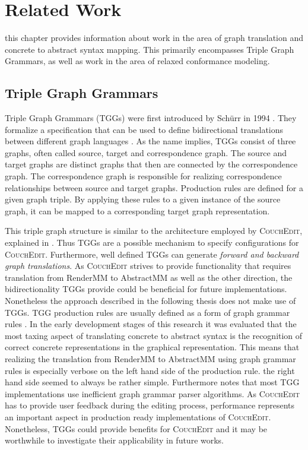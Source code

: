 \chapter{Related Work}
\label{ch:related_work}
this chapter provides information about work in the area of graph translation and concrete to abstract syntax mapping. This primarily encompasses Triple Graph Grammars, as well as work in the area of relaxed conformance modeling.




\section{Triple Graph Grammars}
\label{sec:tggs}
Triple Graph Grammars (TGGs) were first introduced by Schürr in 1994 \cite{schurr_specification_1994}. They formalize a specification that can be used to define bidirectional translations between different graph languages \cite{schurr_15_2008}. As the name implies, TGGs consist of three graphs, often called source, target and correspondence graph. The source and target graphs are distinct graphs that then are connected by the correspondence graph. The correspondence graph is responsible for realizing correspondence relationships between source and target graphs. Production rules are defined for a given graph triple. By applying these rules to a given instance of the source graph, it can be mapped to a corresponding target graph representation.

This triple graph structure is similar to the architecture employed by \textsc{CouchEdit}, explained in . Thus TGGs are a possible mechanism to specify configurations for \textsc{CouchEdit}. Furthermore, well defined TGGs can generate \emph{forward and backward graph translations}. As \textsc{CouchEdit} strives to provide functionality that requires translation from RenderMM to AbstractMM as well as the other direction, the bidirectionality TGGs provide could be beneficial for future implementations. Nonetheless the approach described in the following thesis does not make use of TGGs. TGG production rules are usually defined as a form of graph grammar rules \cite{schurr_15_2008}. In the early development stages of this research it was evaluated that the most taxing aspect of translating concrete to abstract syntax is the recognition of correct concrete representations in the graphical representation. This means that realizing the translation from RenderMM to AbstractMM using graph grammar rules is especially verbose on the left hand side of the production rule. the right hand side seemed to always be rather simple. Furthermore \cite{schurr_15_2008} notes that most TGG implementations use inefficient graph grammar parser algorithms. As \textsc{CouchEdit} has to provide user feedback during the editing process, performance represents an important aspect in production ready implementations of \textsc{CouchEdit}. Nonetheless, TGGs could provide benefits for \textsc{CouchEdit} and it may be worthwhile to investigate their applicability in future works. 


